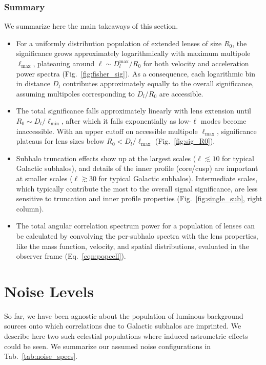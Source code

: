 \documentclass[twocolumn]{aastex63}
\newcommand{\SMS}[1]{{\bf \color{deepgreen}{[SM: #1]}}}
\begin{document}
\subsubsection{Summary}
\label{sec:summary}

We summarize here the main takeaways of this section. %
\begin{itemize}
\item For a uniformly distribution population of extended lenses of size $R_0$, the significance grows approximately logarithmically with maximum multipole $\ell_\mathrm{max}$, plateauing around $\ell\sim D_l^{\mathrm{max}}/R_0$ for both velocity and acceleration power spectra (Fig.~\ref{fig:fisher_sig}). As a consequence, each logarithmic bin in distance $D_l$ contributes approximately equally to the overall significance, assuming multipoles corresponding to $D_l/R_0$ are accessible.
\item The total significance falls approximately linearly with lens extension until $R_0\sim D_l / \ell_\mathrm{min}$, after which it falls exponentially as low-$\ell$ modes become inaccessible. With an upper cutoff on accessible multipole $\ell_\mathrm{max}$, significance plateaus for lens sizes below $R_0 < D_l / \ell_\mathrm{max}$ (Fig.~\ref{fig:sig_R0}).
\item Subhalo truncation effects show up at the largest scales ($\ell \lesssim 10$ for typical Galactic subhalos), and details of the inner profile (core/cusp) are important at smaller scales ($\ell \gtrsim 30$ for typical Galactic subhalos). Intermediate scales, which typically contribute the most to the overall signal significance, are less sensitive to truncation and inner profile properties (Fig.~\ref{fig:single_sub}, right column).
\item The total angular correlation spectrum power for a population of lenses can be calculated by convolving the per-subhalo spectra with the lens properties, like the mass function, velocity, and spatial distributions, evaluated in the observer frame (Eq.~\ref{eqn:popcell}).
\end{itemize}


\section{Noise Levels}
\label{sec:noise}

So far, we have been agnostic about the population of luminous background sources onto which correlations due to Galactic subhalos are imprinted. We describe here two such celestial populations where induced astrometric effects could be seen. We summarize our assumed noise configurations in Tab.~\ref{tab:noise_specs}.
\end{document}
